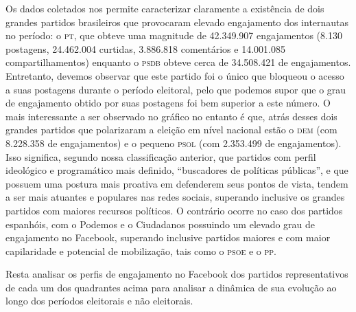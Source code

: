 Os dados coletados nos permite caracterizar claramente a existência de dois
grandes partidos brasileiros que provocaram elevado engajamento dos
internautas no período: o \textsc{pt}, que obteve uma magnitude de 42.349.907
engajamentos (8.130 postagens, 24.462.004 curtidas, 3.886.818
comentários e 14.001.085 compartilhamentos) enquanto o \textsc{psdb} obteve cerca
de 34.508.421 de engajamentos. Entretanto, devemos observar que este
partido foi o único que bloqueou o acesso a suas postagens durante o
período eleitoral, pelo que podemos supor que o grau de engajamento
obtido por suas postagens foi bem superior a este número. O mais
interessante a ser observado no gráfico no entanto é que, atrás desses
dois grandes partidos que polarizaram a eleição em nível nacional estão
o \textsc{dem} (com 8.228.358 de engajamentos) e o pequeno \textsc{psol} (com 2.353.499 de
engajamentos). Isso significa, segundo nossa classificação anterior, que
partidos com perfil ideológico e programático mais definido,
``buscadores de políticas públicas'', e que possuem uma postura mais
proativa em defenderem seus pontos de vista, tendem a ser mais atuantes
e populares nas redes sociais, superando inclusive os grandes partidos
com maiores recursos políticos. O contrário ocorre no caso dos partidos
espanhóis, com o Podemos e o Ciudadanos possuindo um elevado grau de
engajamento no Facebook, superando inclusive partidos maiores e com
maior capilaridade e potencial de mobilização, tais como o \textsc{psoe} e o \textsc{pp}.

Resta analisar os perfis de engajamento no Facebook dos partidos
representativos de cada um dos quadrantes acima para analisar a dinâmica
de sua evolução ao longo dos períodos eleitorais e não eleitorais.

